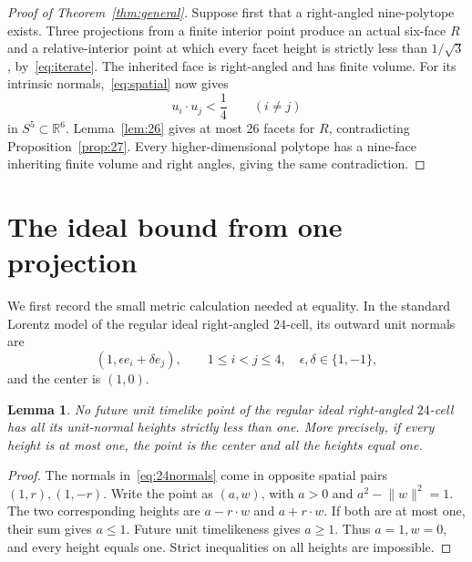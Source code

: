 \documentclass[11pt]{article}
\newtheorem{lemma}[theorem]{Lemma}
\theoremstyle{remark}
\newcommand{\RR}{\mathbb R}
\newcommand{\norm}[1]{\lVert #1\rVert}
\begin{document}
\begin{proof}[Proof of Theorem~\ref{thm:general}]
Suppose first that a right-angled nine-polytope exists. Three
projections from a finite interior point produce an actual six-face
$R$ and a relative-interior point at which every facet height is
strictly less than $1/\sqrt3$, by~\eqref{eq:iterate}.
The inherited face is right-angled and has finite volume.
For its intrinsic normals,~\eqref{eq:spatial} now gives
\[
 u_i\cdot u_j<\frac14\qquad(i\ne j)
\]
in $S^5\subset\RR^6$. Lemma~\ref{lem:26} gives at most $26$
facets for $R$, contradicting Proposition~\ref{prop:27}.
Every higher-dimensional polytope has a nine-face inheriting finite
volume and right angles, giving the same contradiction.
\end{proof}

\section{The ideal bound from one projection}\label{sec:ideal}

We first record the small metric calculation needed at equality.
In the standard Lorentz model of the regular ideal right-angled
$24$-cell, its outward unit normals are
\begin{equation}\label{eq:24normals}
 (1,\epsilon e_i+\delta e_j),\qquad
 1\le i<j\le4,\quad\epsilon,\delta\in\{1,-1\},
\end{equation}
and the center is $(1,0)$.

\begin{lemma}\label{lem:center}
No future unit timelike point of the regular ideal right-angled
$24$-cell has all its unit-normal heights strictly less than one.
More precisely, if every height is at most one, the point is the
center and all the heights equal one.
\end{lemma}
\begin{proof}
The normals in~\eqref{eq:24normals} come in opposite spatial pairs
$(1,r),(1,-r)$. Write the point as $(a,w)$, with $a>0$ and
$a^2-\norm w^2=1$. The two corresponding heights are
$a-r\cdot w$ and $a+r\cdot w$. If both are at most one, their
sum gives $a\le1$. Future unit timelikeness gives $a\ge1$.
Thus $a=1,w=0$, and every height equals one. Strict inequalities
on all heights are impossible.
\end{proof}
\end{document}
